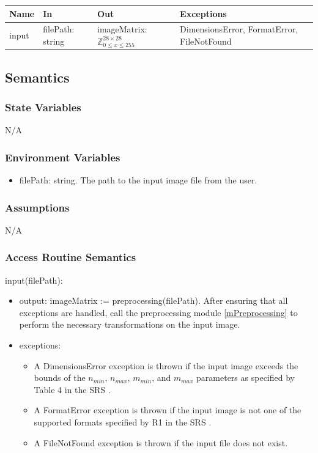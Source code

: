 \documentclass[12pt, titlepage]{article}
\begin{document}
\begin{center}
\begin{tabular}{p{2cm} p{2cm} p{3cm} p{6cm}}
\hline
\textbf{Name} & \textbf{In} & \textbf{Out} & \textbf{Exceptions} \\
\hline
input & filePath: string & imageMatrix: $\mathbb{Z}^{28 \times 28}_{0 \le x \le 255}$ & DimensionsError, FormatError, FileNotFound \\
\hline
\end{tabular}
\end{center}

\subsection{Semantics}

\subsubsection{State Variables}

N/A

\subsubsection{Environment Variables}

\begin{itemize}
  \item filePath: string. The path to the input image file from the user.
\end{itemize}

\subsubsection{Assumptions}

N/A

\subsubsection{Access Routine Semantics}

\noindent input(filePath):
\begin{itemize} 
\item output: imageMatrix := preprocessing(filePath). After ensuring that all
exceptions are handled, call the preprocessing module \ref{mPreprocessing} to
perform the necessary transformations on the input image.
\item exceptions:
\begin{itemize}
  \item A DimensionsError exception is thrown if the input image
  exceeds the bounds of the $n_{min}$, $n_{max}$, $m_{min}$, and $m_{max}$
  parameters as specified by Table 4 in the SRS \cite[4.2.6]{SRS}.
  \item A FormatError exception is thrown if the input image is not one of the supported formats
  specified by R1 in the SRS \cite[5.1.1]{SRS}.
  \item A FileNotFound exception is thrown if the input file does not exist.
\end{itemize}
\end{itemize}
\end{document}
